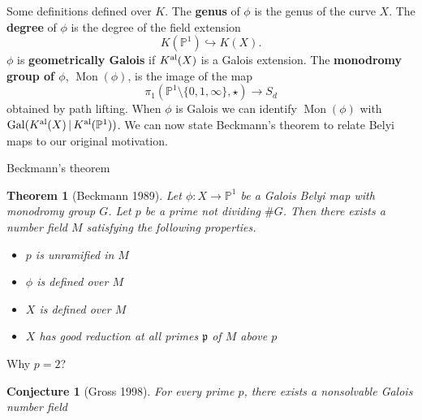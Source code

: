\documentclass[xcolor=dvipsnames]{beamer}
\theoremstyle{plain}
\newtheorem*{thm}{Theorem}
\newtheorem*{conj}{Conjecture}
\newcommand{\PP}{\mathbb P}
\newcommand{\Kal}{{{K}^{\textup{al}}}}
\DeclareMathOperator{\Mon}{Mon}
\DeclareMathOperator{\Gal}{Gal}
\begin{document}
{\begin{frame}{Some definitions}
      defined over $K$.
      \pause\newline
      The \textbf{genus} of $\phi$ is the genus
      of the curve $X$.
      \pause\newline
      The \textbf{degree} of $\phi$
      is the degree of the field extension
      \[
        K(\PP^1)\hookrightarrow K(X).
      \]
      \pause
      $\phi$ is \textbf{geometrically Galois}
      if $\Kal(X)$ is a Galois extension.
      \pause\newline
      The \textbf{monodromy group of $\phi$},
      $\Mon(\phi)$,
      is the image of the map
      \[
        \pi_1(\PP^1\setminus\{0,1,\infty\},\star)
        \to S_d
      \]
      obtained by path lifting.
      \pause\newline
      When $\phi$ is Galois we
      can identify $\Mon(\phi)$ with
      $\Gal(\Kal(X)\,|\,\Kal(\PP^1))$.
      \pause\newline
      We can now state Beckmann's theorem
      to relate Belyi maps to our original
      motivation.
    \end{frame}
    \begin{frame}{Beckmann's theorem}
      \begin{thm}[Beckmann 1989]
        \vspace{1pt}
        Let $\phi\colon X\to\PP^1$ be a Galois
        Belyi map with monodromy group $G$.
        Let $p$ be a prime not dividing
        $\#G$.
        \pause\newline
        Then there exists a number field $M$
        satisfying the following properties.
        \pause
        \begin{itemize}
          \item
            $p$ is unramified in $M$
          \item
            $\phi$ is defined over $M$
          \item
            $X$ is defined over $M$
          \item
            $X$ has good reduction at all
            primes $\mathfrak{p}$ of $M$
            above $p$
        \end{itemize}
      \end{thm}
    \end{frame}
    \begin{frame}{Why $p=2$?}
      \begin{conj}[Gross 1998]
        \vspace{1pt}
        For every prime $p$,
        there exists a nonsolvable Galois number field

\end{conj}
\end{frame}}
\end{document}
